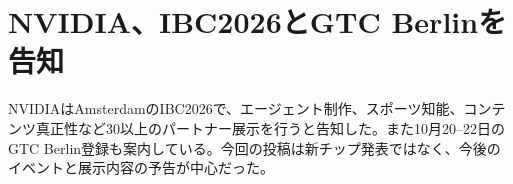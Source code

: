 \section{NVIDIA、IBC2026とGTC Berlinを告知}
NVIDIAはAmsterdamのIBC2026で、エージェント制作、スポーツ知能、コンテンツ真正性など30以上のパートナー展示を行うと告知した。また10月20--22日のGTC Berlin登録も案内している。今回の投稿は新チップ発表ではなく、今後のイベントと展示内容の予告が中心だった。
